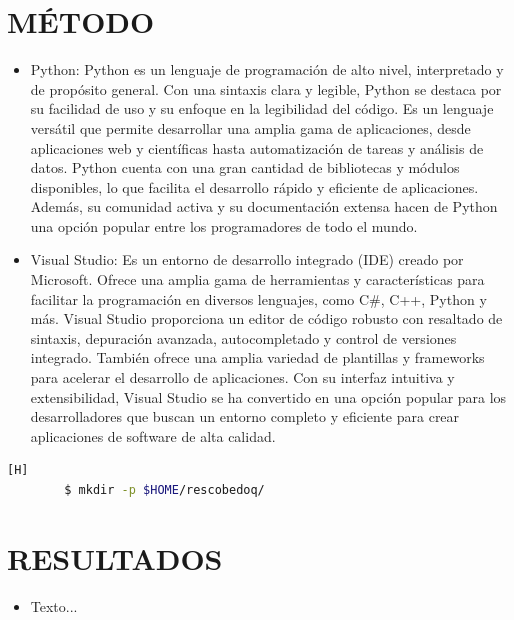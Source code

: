 \documentclass{article}
\begin{document}
\section{MÉTODO}
\begin{itemize}
\item Python: Python es un lenguaje de programación de alto nivel, interpretado y de propósito general. Con una sintaxis clara y legible, Python se destaca por su facilidad de uso y su enfoque en la legibilidad del código. Es un lenguaje versátil que permite desarrollar una amplia gama de aplicaciones, desde aplicaciones web y científicas hasta automatización de tareas y análisis de datos. Python cuenta con una gran cantidad de bibliotecas y módulos disponibles, lo que facilita el desarrollo rápido y eficiente de aplicaciones. Además, su comunidad activa y su documentación extensa hacen de Python una opción popular entre los programadores de todo el mundo.
\item Visual Studio: Es un entorno de desarrollo integrado (IDE) creado por Microsoft. Ofrece una amplia gama de herramientas y características para facilitar la programación en diversos lenguajes, como C#, C++, Python y más. Visual Studio proporciona un editor de código robusto con resaltado de sintaxis, depuración avanzada, autocompletado y control de versiones integrado. También ofrece una amplia variedad de plantillas y frameworks para acelerar el desarrollo de aplicaciones. Con su interfaz intuitiva y extensibilidad, Visual Studio se ha convertido en una opción popular para los desarrolladores que buscan un entorno completo y eficiente para crear aplicaciones de software de alta calidad.
\end{itemize}	
\begin{lstlisting}[language=bash,caption={Creando directorio de trabajo}][H]
		$ mkdir -p $HOME/rescobedoq/
	\end{lstlisting}
	
	\begin{figure}[H]
	\end{figure}
	
	
	
\section{RESULTADOS}
	\begin{itemize}	
		\item Texto...
	\end{itemize}
	
\end{document}
